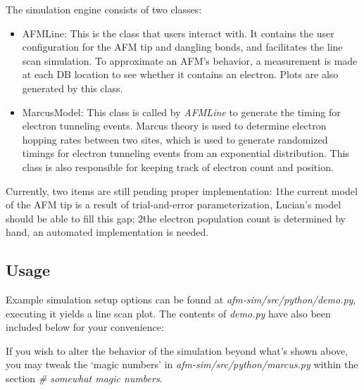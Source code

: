 \documentclass{article}
\begin{document}
The simulation engine consists of two classes:

\begin{itemize}
  \item AFMLine: This is the class that users interact with. It contains the user configuration for the AFM tip and dangling bonds, and facilitates the line scan simulation. To approximate an AFM's behavior, a measurement is made at each DB location to see whether it contains an electron. Plots are also generated by this class.
  \item MarcusModel: This class is called by \textit{AFMLine} to generate the timing for electron tunneling events. Marcus theory is used to determine electron hopping rates between two sites, which is used to generate randomized timings for electron tunneling events from an exponential distribution. This class is also responsible for keeping track of electron count and position.
\end{itemize}

Currently, two items are still pending proper implementation: 1\. the current model of the AFM tip is a result of trial-and-error parameterization, Lucian's model should be able to fill this gap; 2\. the electron population count is determined by hand, an automated implementation is needed.


\subsection{Usage}

Example simulation setup options can be found at \textit{afm-sim/src/python/demo.py}, executing it yields a line scan plot. The contents of \textit{demo.py} have also been included below for your convenience:



If you wish to alter the behavior of the simulation beyond what's shown above, you may tweak the `magic numbers' in \textit{afm-sim/src/python/marcus.py} within the section \textit{\# somewhat magic numbers}.
\end{document}
